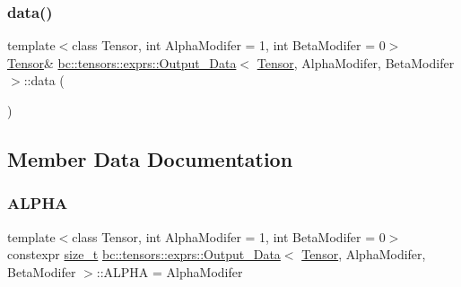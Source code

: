 \mbox{\label{structbc_1_1tensors_1_1exprs_1_1Output__Data_a45a7ad6d58afcf0219836c49123f9fbf}} 
\subsubsection{\texorpdfstring{data()}{data()}\hspace{0.1cm}{\footnotesize\ttfamily [2/2]}}
{\footnotesize\ttfamily template$<$class Tensor, int Alpha\+Modifer = 1, int Beta\+Modifer = 0$>$ \\
\hyperlink{namespacebc_a659391e47ab612be3ba6c18cf9c89159}{Tensor}\& \hyperlink{structbc_1_1tensors_1_1exprs_1_1Output__Data}{bc\+::tensors\+::exprs\+::\+Output\+\_\+\+Data}$<$ \hyperlink{namespacebc_a659391e47ab612be3ba6c18cf9c89159}{Tensor}, Alpha\+Modifer, Beta\+Modifer $>$\+::data (\begin{DoxyParamCaption}{ }\end{DoxyParamCaption})\hspace{0.3cm}{\ttfamily [inline]}}



\subsection{Member Data Documentation}
\mbox{\label{structbc_1_1tensors_1_1exprs_1_1Output__Data_a8180bfc8cd47bd07e617da232baca625}} 
\subsubsection{\texorpdfstring{A\+L\+P\+HA}{ALPHA}}
{\footnotesize\ttfamily template$<$class Tensor, int Alpha\+Modifer = 1, int Beta\+Modifer = 0$>$ \\
constexpr \hyperlink{namespacebc_aaf8e3fbf99b04b1b57c4f80c6f55d3c5}{size\+\_\+t} \hyperlink{structbc_1_1tensors_1_1exprs_1_1Output__Data}{bc\+::tensors\+::exprs\+::\+Output\+\_\+\+Data}$<$ \hyperlink{namespacebc_a659391e47ab612be3ba6c18cf9c89159}{Tensor}, Alpha\+Modifer, Beta\+Modifer $>$\+::A\+L\+P\+HA = Alpha\+Modifer\hspace{0.3cm}{\ttfamily [static]}}

